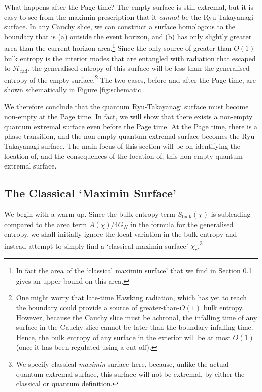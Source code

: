 \documentclass[11pt,a4paper]{article}
\begin{document}
What happens after the Page time? The empty surface is still extremal, but it is easy to see from the maximin prescription that it \emph{cannot} be the Ryu-Takayanagi surface. In any Cauchy slice, we can construct a surface homologous to the boundary that is (a) outside the event horizon, and (b) has only slightly greater area than the current horizon area.\footnote{In fact the area of the `classical maximin surface' that we find in Section \ref{sec:classicalmaximin} gives an upper bound on this area.} Since the only source of greater-than-$O(1)$ bulk entropy is the interior modes that are entangled with radiation that escaped to $\mathcal{H}_\text{rad}$, the generalised entropy of this surface will be less than the generalised entropy of the empty surface.\footnote{One might worry that late-time Hawking radiation, which has yet to reach the boundary could provide a source of greater-than-$O(1)$ bulk entropy. However, because the Cauchy slice must be achronal, the infalling time of any surface in the Cauchy slice cannot be later than the boundary infalling time. Hence, the bulk entropy of any surface in the exterior will be at most $O(1)$ (once it has been regulated using a cut-off).} The two cases, before and after the Page time, are shown schematically in Figure \ref{fig:schematic}.

We therefore conclude that the quantum Ryu-Takayanagi surface must become non-empty at the Page time. In fact, we will show that there exists a non-empty quantum extremal surface even before the Page time. At the Page time, there is a phase transition, and the non-empty quantum extremal surface becomes the Ryu-Takayanagi surface. The main focus of this section will be on identifying the location of, and the consequences of the location of, this non-empty quantum extremal surface.


\subsection{The Classical `Maximin Surface'} \label{sec:classicalmaximin}

We begin with a warm-up. Since the bulk entropy term $S_\text{bulk}(\chi)$ is subleading compared to the area term $A(\chi)/4G_N$ in the formula for the generalised entropy, we shall initially ignore the local variation in the bulk entropy and instead attempt to simply find a `classical maximin surface' $\chi_c$.\footnote{We specify classical \emph{maximin} surface here, because, unlike the actual quantum extremal surface, this surface will not be extremal, by either the classical or quantum definition.} 
\end{document}
